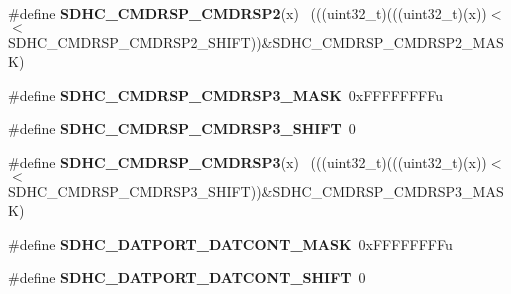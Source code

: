 \begin{DoxyCompactItemize}
\item 
\hypertarget{group___s_d_h_c___register___masks_gaf5760b52fd9118ee803f3beab18ad480}{}\#define {\bfseries S\+D\+H\+C\+\_\+\+C\+M\+D\+R\+S\+P\+\_\+\+C\+M\+D\+R\+S\+P2}(x)                                  ~(((uint32\+\_\+t)(((uint32\+\_\+t)(x))$<$$<$S\+D\+H\+C\+\_\+\+C\+M\+D\+R\+S\+P\+\_\+\+C\+M\+D\+R\+S\+P2\+\_\+\+S\+H\+I\+F\+T))\&S\+D\+H\+C\+\_\+\+C\+M\+D\+R\+S\+P\+\_\+\+C\+M\+D\+R\+S\+P2\+\_\+\+M\+A\+S\+K)\label{group___s_d_h_c___register___masks_gaf5760b52fd9118ee803f3beab18ad480}

\item 
\hypertarget{group___s_d_h_c___register___masks_ga455887881ffdaa8edd983e6e68ffe4d2}{}\#define {\bfseries S\+D\+H\+C\+\_\+\+C\+M\+D\+R\+S\+P\+\_\+\+C\+M\+D\+R\+S\+P3\+\_\+\+M\+A\+S\+K}~0x\+F\+F\+F\+F\+F\+F\+F\+Fu\label{group___s_d_h_c___register___masks_ga455887881ffdaa8edd983e6e68ffe4d2}

\item 
\hypertarget{group___s_d_h_c___register___masks_ga5b08d155eccc29ab8f8ff62bc10a23a1}{}\#define {\bfseries S\+D\+H\+C\+\_\+\+C\+M\+D\+R\+S\+P\+\_\+\+C\+M\+D\+R\+S\+P3\+\_\+\+S\+H\+I\+F\+T}~0\label{group___s_d_h_c___register___masks_ga5b08d155eccc29ab8f8ff62bc10a23a1}

\item 
\hypertarget{group___s_d_h_c___register___masks_gab539b32b672f70faaf815a9e3529444b}{}\#define {\bfseries S\+D\+H\+C\+\_\+\+C\+M\+D\+R\+S\+P\+\_\+\+C\+M\+D\+R\+S\+P3}(x)                                  ~(((uint32\+\_\+t)(((uint32\+\_\+t)(x))$<$$<$S\+D\+H\+C\+\_\+\+C\+M\+D\+R\+S\+P\+\_\+\+C\+M\+D\+R\+S\+P3\+\_\+\+S\+H\+I\+F\+T))\&S\+D\+H\+C\+\_\+\+C\+M\+D\+R\+S\+P\+\_\+\+C\+M\+D\+R\+S\+P3\+\_\+\+M\+A\+S\+K)\label{group___s_d_h_c___register___masks_gab539b32b672f70faaf815a9e3529444b}

\item 
\hypertarget{group___s_d_h_c___register___masks_gad3095c85c287cb31fd4cd815f8516213}{}\#define {\bfseries S\+D\+H\+C\+\_\+\+D\+A\+T\+P\+O\+R\+T\+\_\+\+D\+A\+T\+C\+O\+N\+T\+\_\+\+M\+A\+S\+K}~0x\+F\+F\+F\+F\+F\+F\+F\+Fu\label{group___s_d_h_c___register___masks_gad3095c85c287cb31fd4cd815f8516213}

\item 
\hypertarget{group___s_d_h_c___register___masks_ga8d1d79a58015eaa7fe8f8dc6f3655781}{}\#define {\bfseries S\+D\+H\+C\+\_\+\+D\+A\+T\+P\+O\+R\+T\+\_\+\+D\+A\+T\+C\+O\+N\+T\+\_\+\+S\+H\+I\+F\+T}~0\label{group___s_d_h_c___register___masks_ga8d1d79a58015eaa7fe8f8dc6f3655781}


\end{DoxyCompactItemize}
